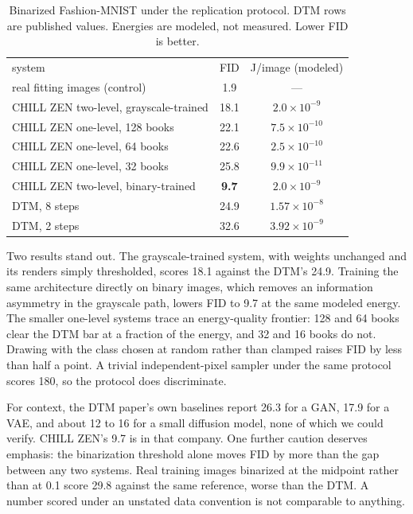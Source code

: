 \documentclass[reprint,amsmath,amssymb,aps,nofootinbib]{revtex4-2}
\begin{document}
\begin{table}
\caption{Binarized Fashion-MNIST under the replication protocol. DTM
rows are published values. Energies are modeled, not measured. Lower
FID is better.\label{tab:h2h}}
\begin{ruledtabular}
\footnotesize
\begin{tabular}{lcc}
system & FID & J/image (modeled) \\
\colrule
real fitting images (control) & 1.9 & --- \\
\colrule
CHILL ZEN two-level, grayscale-trained & 18.1 & $2.0\times10^{-9}$ \\
CHILL ZEN one-level, 128 books & 22.1 & $7.5\times10^{-10}$ \\
CHILL ZEN one-level, 64 books & 22.6 & $2.5\times10^{-10}$ \\
CHILL ZEN one-level, 32 books & 25.8 & $9.9\times10^{-11}$ \\
\colrule
CHILL ZEN two-level, binary-trained & \textbf{9.7} & $2.0\times10^{-9}$ \\
\colrule
DTM, 8 steps \cite{jelincic2025dtm} & 24.9 & $1.57\times10^{-8}$ \\
DTM, 2 steps \cite{jelincic2025dtm} & 32.6 & $3.92\times10^{-9}$ \\
\end{tabular}
\end{ruledtabular}
\end{table}

Two results stand out. The grayscale-trained system, with weights
unchanged and its renders simply thresholded, scores 18.1 against the
DTM's 24.9. Training the same architecture directly on binary images,
which removes an information asymmetry in the grayscale path, lowers
FID to 9.7 at the same modeled energy. The smaller one-level systems
trace an energy-quality frontier: 128 and 64 books clear the DTM bar at
a fraction of the energy, and 32 and 16 books do not. Drawing with the
class chosen at random rather than clamped raises FID by less than half
a point. A trivial independent-pixel sampler under the same protocol
scores 180, so the protocol does discriminate.

For context, the DTM paper's own baselines report 26.3 for a GAN, 17.9
for a VAE, and about 12 to 16 for a small diffusion model, none of
which we could verify. CHILL ZEN's 9.7 is in that company. One further
caution deserves emphasis: the binarization threshold alone moves FID
by more than the gap between any two systems. Real training images
binarized at the midpoint rather than at 0.1 score 29.8 against the
same reference, worse than the DTM. A number scored under an unstated
data convention is not comparable to anything.
\end{document}
